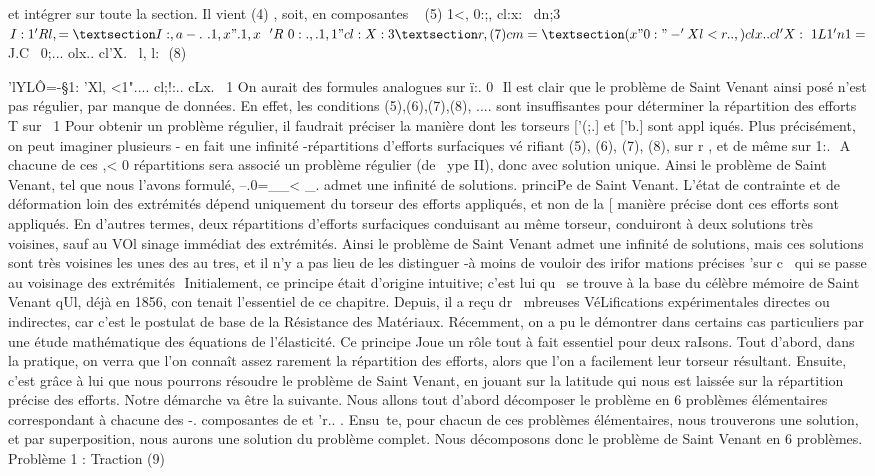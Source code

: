{et intégrer sur toute la section. Il vient 
(4) 	, 
soit, en composantes 
~
(5) 1<, 0:;, cl:x:~ dn;3
$I: 
1 
'Rl,= §I:, a-.~ .1,x" .1,x~ 
~
'R~ 0:., .1,1" cl:X:3
§r, 
(7) 
cm = § ( x" 0:" -'Xl <r..,) clx.. cl'X:~ 
1 L 
1 
'n1 = $ J.C~ 0;... olx.. cl'X.~ 
l, l:

(8) 	{ 'lYLÔ=-§1: 'Xl, <1".... cl;!:.. cLx.~ 
1 
On aurait des formules analogues sur ï:. 0  
Il est clair que le problème de Saint Venant ainsi posé n'est pas régulier, par manque de données. En effet, les conditions (5),(6),(7),(8), 
.... 
sont insuffisantes pour déterminer la répartition des efforts T sur ~1 Pour obtenir un problème régulier, il faudrait préciser la manière dont les torseurs ['(;.] et ['b.] sont appl iqués. Plus précisément, on peut imaginer 
plusieurs -	en fait une infinité -répartitions d'efforts surfaciques vé­
rifiant (5), (6), (7), (8), sur r , et de même sur 1:.  A chacune de ces
,< 	0 
répartitions sera associé un problème régulier (de ~ype II), donc avec solu­tion unique. Ainsi le problème de Saint Venant, tel que nous l'avons formulé, 
--.0=__< _.
admet une infinité de solutions. 
princiPe de Saint Venant. L'état de contrainte et de déformation loin des 
extrémités dépend uniquement du torseur des efforts appliqués, et non de la 
[
manière précise dont ces efforts sont appliqués. 
En d'autres termes, deux répartitions d'efforts surfaciques condui­sant au même torseur, conduiront à deux solutions très voisines, sauf au VOl­
sinage immédiat des extrémités. Ainsi le problème de Saint Venant admet une 
infinité de solutions, mais ces solutions sont très voisines les unes des au­
tres, et il n'y a pas lieu de les distinguer -à moins de vouloir des irifor­
mations précises 'sur c~ qui se passe au voisinage des extrémités ­
Initialement, 	ce principe était d'origine intuitive; c'est lui qu~ 
se trouve à la base du célèbre mémoire de Saint Venant qUl, déjà en 1856, con­
tenait l'essentiel de ce chapitre. Depuis, il a reçu dr ~mbreuses VéLifica­tions expérimentales directes ou indirectes, car c'est le postulat de base de la Résistance des Matériaux. Récemment, on a pu le démontrer dans certains cas particuliers par une étude mathématique des équations de l'élasticité. 
Ce principe Joue un rôle tout à fait essentiel pour deux raIsons. Tout d'abord, dans la pratique, on verra que l'on connaît assez rarement la répartition des efforts, alors que l'on a facilement leur torseur résultant. Ensuite, c'est grâce à lui que nous pourrons résoudre le problème de Saint Venant, en jouant sur la latitude qui nous est laissée sur la répartition pré­cise des efforts. Notre démarche va être la suivante. Nous allons tout d'abord décomposer le problème en 6 problèmes élémentaires correspondant à chacune des
-.
composantes de et 'r\1.. . Ensu~te, pour chacun de ces problèmes élémentaires, nous trouverons une solution, et par superposition, nous aurons une solution 
du problème complet. 
Nous décomposons donc le problème de Saint Venant en 6 problèmes. Problème 1 : Traction 
(9) 

}}
